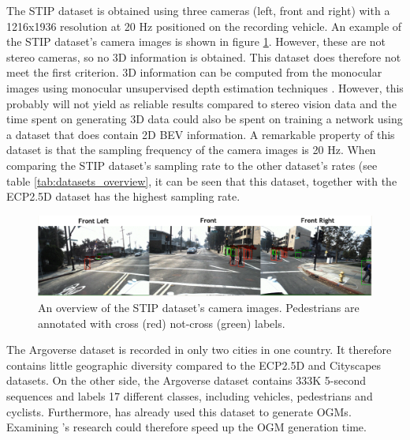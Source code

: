 The \gls{STIP} dataset \cite{liu2020spatiotemporal} is obtained using three cameras (left, front and right) with a 1216x1936 resolution at 20 Hz positioned on the recording vehicle. An example of the \gls{STIP} dataset's camera images is shown in figure \ref{fig:dat_stip}. However, these are not stereo cameras, so no 3D information is obtained. This dataset does therefore not meet the first criterion. 3D information can be computed from the monocular images using monocular unsupervised depth estimation techniques \cite{godard2017unsupervised}. However, this probably will not yield as reliable results compared to stereo vision data and the time spent on generating 3D data could also be spent on training a network using a dataset that does contain 2D \gls{BEV} information. A remarkable property of this dataset is that the sampling frequency of the camera images is 20 Hz. When comparing the \gls{STIP} dataset's sampling rate to the other dataset's rates (see table \ref{tab:datasets_overview}, it can be seen that this dataset, together with the \gls{ECP2.5D} \cite{braun2020ecp2} dataset has the highest sampling rate. \\

\begin{figure}[h!]
	\centering
	\includegraphics[width=0.8\linewidth]{Figures/Datasets/STIP_Dataset}
	\caption{An overview of the \gls{STIP} \cite{liu2020spatiotemporal} dataset's camera images. Pedestrians are annotated with cross (red) not-cross (green) labels.  \cite{liu2020spatiotemporal}}  
	\label{fig:dat_stip}
\end{figure}

The Argoverse dataset \cite{chang2019argoverse} is recorded in only two cities in one country. It therefore contains little geographic diversity compared to the \gls{ECP2.5D} \cite{braun2020ecp2} and Cityscapes \cite{cordts2016cityscapes} datasets. On the other side, the Argoverse dataset \cite{chang2019argoverse} contains 333K 5-second sequences and labels 17 different classes, including vehicles, pedestrians and cyclists. Furthermore, \cite{roddick2020predicting} has already used this dataset to generate \glspl{OGM}. Examining \cite{roddick2020predicting}'s research could therefore speed up the \gls{OGM} generation time. \\

